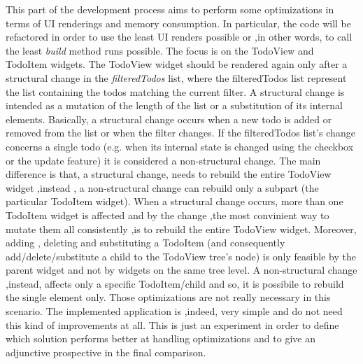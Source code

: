 
This part of the development process aims to perform some optimizations in terms of UI renderings and memory consumption. In particular, the code will be refactored in order to use the least UI renders possible or ,in other words, to call the least \textit{build} method runs possible. The focus is on the TodoView and TodoItem widgets. The TodoView widget should be rendered again only after a structural change in the \textit{filteredTodos} list, where the filteredTodos list represent the list containing the todos matching the current filter. A structural change is intended as a mutation of the length of the list or a substitution of its internal elements. Basically, a structural change occurs when a new todo is added or removed from the list or when the filter changes. If the filteredTodos list's change concerns a single todo (e.g. when its internal state is changed using the checkbox or the update feature) it is considered a non-structural change. The main difference is that, a structural change, needs to rebuild the entire TodoView widget ,instead , a non-structural change can rebuild only a subpart (the particular TodoItem widget). When a structural change occurs, more than one TodoItem widget is affected and by the change ,the most convinient way to mutate them all consistently ,is to rebuild the entire TodoView widget. Moreover, adding , deleting and substituting a TodoItem (and consequently add/delete/substitute a child to the TodoView tree's node) is only feasible by the parent widget and not by widgets on the same tree level. A non-structural change ,instead, affects only a specific TodoItem/child and so, it is possibile to rebuild the single element only. Those optimizations are not really necessary in this scenario. The implemented application is ,indeed, very simple and do not need this kind of improvements at all. This is just an experiment in order to define which solution performs better at handling optimizations and to give an adjunctive prospective in the final comparison.